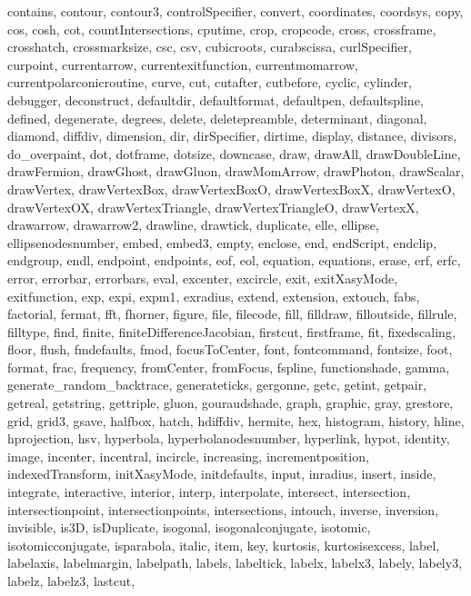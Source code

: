 {{  contains, contour, contour3, controlSpecifier, convert, coordinates,
  coordsys, copy, cos, cosh, cot, countIntersections, cputime, crop,
  cropcode, cross, crossframe, crosshatch, crossmarksize, csc, csv,
  cubicroots, curabscissa, curlSpecifier, curpoint, currentarrow,
  currentexitfunction, currentmomarrow, currentpolarconicroutine, curve, cut,
  cutafter, cutbefore, cyclic, cylinder, debugger, deconstruct, defaultdir,
  defaultformat, defaultpen, defaultspline, defined, degenerate, degrees,
  delete, deletepreamble, determinant, diagonal, diamond, diffdiv, dimension,
  dir, dirSpecifier, dirtime, display, distance, divisors, do_overpaint, dot,
  dotframe, dotsize, downcase, draw, drawAll, drawDoubleLine, drawFermion,
  drawGhost, drawGluon, drawMomArrow, drawPhoton, drawScalar, drawVertex,
  drawVertexBox, drawVertexBoxO, drawVertexBoxX, drawVertexO, drawVertexOX,
  drawVertexTriangle, drawVertexTriangleO, drawVertexX, drawarrow,
  drawarrow2, drawline, drawtick, duplicate, elle, ellipse,
  ellipsenodesnumber, embed, embed3, empty, enclose, end, endScript, endclip,
  endgroup, endl, endpoint, endpoints, eof, eol, equation, equations, erase,
  erf, erfc, error, errorbar, errorbars, eval, excenter, excircle, exit,
  exitXasyMode, exitfunction, exp, expi, expm1, exradius, extend, extension,
  extouch, fabs, factorial, fermat, fft, fhorner, figure, file, filecode,
  fill, filldraw, filloutside, fillrule, filltype, find, finite,
  finiteDifferenceJacobian, firstcut, firstframe, fit, fixedscaling, floor,
  flush, fmdefaults, fmod, focusToCenter, font, fontcommand, fontsize, foot,
  format, frac, frequency, fromCenter, fromFocus, fspline, functionshade,
  gamma, generate_random_backtrace, generateticks, gergonne, getc, getint,
  getpair, getreal, getstring, gettriple, gluon, gouraudshade, graph,
  graphic, gray, grestore, grid, grid3, gsave, halfbox, hatch, hdiffdiv,
  hermite, hex, histogram, history, hline, hprojection, hsv, hyperbola,
  hyperbolanodesnumber, hyperlink, hypot, identity, image, incenter,
  incentral, incircle, increasing, incrementposition, indexedTransform,
  initXasyMode, initdefaults, input, inradius, insert, inside, integrate,
  interactive, interior, interp, interpolate, intersect, intersection,
  intersectionpoint, intersectionpoints, intersections, intouch, inverse,
  inversion, invisible, is3D, isDuplicate, isogonal, isogonalconjugate,
  isotomic, isotomicconjugate, isparabola, italic, item, key, kurtosis,
  kurtosisexcess, label, labelaxis, labelmargin, labelpath, labels,
  labeltick, labelx, labelx3, labely, labely3, labelz, labelz3, lastcut,
}}
